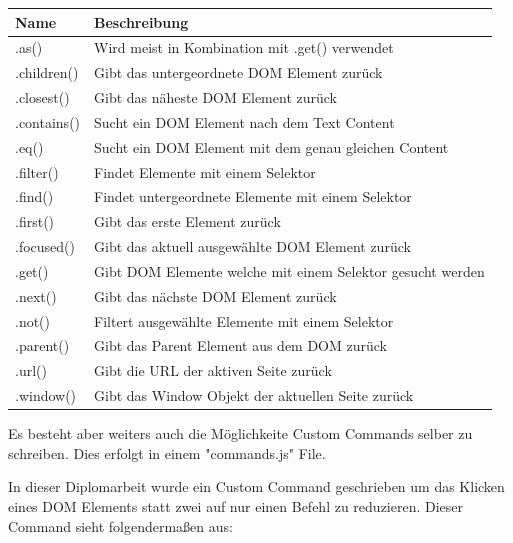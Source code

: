 \begin{center}
    \begin{tabular}{ | m{2cm} | m{13cm} | } 
        \hline
        Name & Beschreibung \\ [0.5ex] 
        \hline\hline
        .as() & Wird meist in Kombination mit .get() verwendet \\
        \hline
        .children() & Gibt das untergeordnete DOM Element zurück \\
        \hline
        .closest() & Gibt das näheste DOM Element zurück \\
        \hline
        .contains() & Sucht ein DOM Element nach dem Text Content \\
        \hline
        .eq() & Sucht ein DOM Element mit dem genau gleichen Content  \\
        \hline
        .filter() & Findet Elemente mit einem Selektor \\
        \hline
        .find() & Findet untergeordnete Elemente mit einem Selektor \\
        \hline
        .first() & Gibt das erste Element zurück \\
        \hline
        .focused() & Gibt das aktuell ausgewählte DOM Element zurück \\
        \hline
        .get() & Gibt DOM Elemente welche mit einem Selektor gesucht werden \\
        \hline
        .next() & Gibt das nächste DOM Element zurück \\
        \hline
        .not() & Filtert ausgewählte Elemente mit einem Selektor \\
        \hline
        .parent() & Gibt das Parent Element aus dem DOM zurück \\
        \hline
        .url() & Gibt die URL der aktiven Seite zurück \\
        \hline
        .window() & Gibt das Window Objekt der aktuellen Seite zurück  \\
        \hline
    \end{tabular}
\end{center}

Es besteht aber weiters auch die Möglichkeite Custom Commands selber zu schreiben.
Dies erfolgt in einem "commands.js" File.

In dieser Diplomarbeit wurde ein Custom Command geschrieben um das Klicken eines DOM Elements statt zwei auf nur einen Befehl zu reduzieren. Dieser Command sieht folgendermaßen aus:



